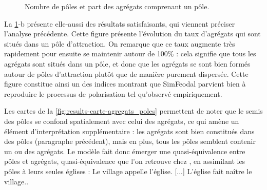 \begin{figure}[H]
	\centering
	\hspace{5pt}
	\caption[Nombre de pôles et part des agrégats comprenant un pôle.]{Nombre de pôles et part des agrégats comprenant un pôle.}
	\label{fig:results-nb-poles-agregats}
\end{figure}

La \cref{fig:results-nb-poles-agregats}-b présente elle-aussi des résultats satisfaisants, qui viennent préciser l'analyse précédente.
Cette figure présente l'évolution du taux d'agrégats qui sont situés dans un pôle d'attraction.
On remarque que ce taux augmente très rapidement pour ensuite se maintenir autour de 100\% : cela signifie que tous les agrégats sont situés dans un pôle, et donc que les agrégats se sont bien formés autour de pôles d'attraction plutôt que de manière purement dispersée.
Cette figure constitue ainsi un des indices montrant que SimFeodal parvient bien à reproduire le processus de polarisation tel qu'observé empiriquement.

Les cartes de la \cref{fig:results-carte-agregats_poles} permettent de noter que le semis des pôles se confond spatialement avec celui des agrégats, ce qui amène un élément d'interprétation supplémentaire : les agrégats sont bien constitués dans des pôles (paragraphe précédent), mais en plus, tous les pôles semblent contenir un ou des agrégats.
Le modèle fait donc émerger une quasi-équivalence entre pôles et agrégats, quasi-équivalence que l'on retrouve chez \textcite[27-28]{le1976eglise}, en assimilant les pôles à leurs seules églises : \og Le village appelle l'église. [...] L'église fait naître le village.\fg{}.

